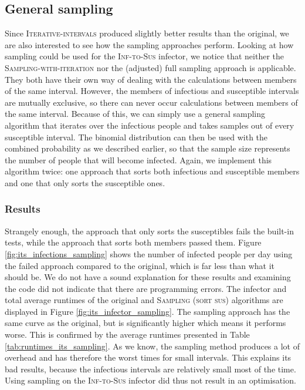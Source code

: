 \subsection{General sampling}
Since \textsc{Iterative-intervals} produced slightly better results than the original, we are also interested to see how the sampling approaches perform. Looking at how sampling could be used for the \textsc{Inf-to-Sus} infector, we notice that neither the \textsc{Sampling-with-iteration} nor the (adjusted) full sampling approach is applicable. They both have their own way of dealing with the calculations between members of the same interval. However, the members of infectious and susceptible intervals are mutually exclusive, so there can never occur calculations between members of the same interval. Because of this, we can simply use a general sampling algorithm that iterates over the infectious people and takes samples out of every susceptible interval. The binomial distribution can then be used with the combined probability as we described earlier, so that the sample size represents the number of people that will become infected. Again, we implement this algorithm twice: one approach that sorts both infectious and susceptible members and one that only sorts the susceptible ones.

\subsubsection{Results}
Strangely enough, the approach that only sorts the susceptibles fails the built-in tests, while the approach that sorts both members passed them. Figure \ref{fig:its_infections_sampling} shows the number of infected people per day using the failed approach compared to the original, which is far less than what it should be. We do not have a sound explanation for these results and examining the code did not indicate that there are programming errors. The infector and total average runtimes of the original and \textsc{Sampling (sort sus)} algorithms are displayed in Figure \ref{fig:its_infector_sampling}. The sampling approach has the same curve as the original, but is significantly higher which means it performs worse. This is confirmed by the average runtimes presented in Table \ref{tab:runtimes_its_sampling}. As we know, the sampling method produces a lot of overhead and has therefore the worst times for small intervals. This explains its bad results, because the infectious intervals are relatively small most of the time. Using sampling on the \textsc{Inf-to-Sus} infector did thus not result in an optimisation.

